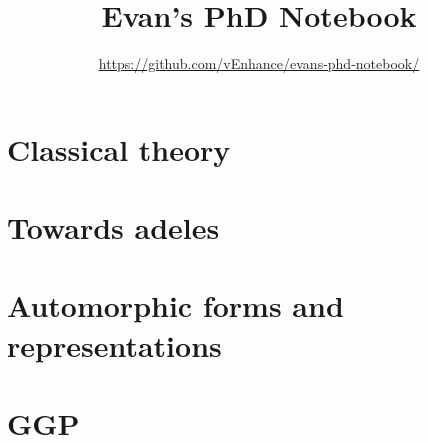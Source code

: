\documentclass[11pt]{scrreprt}
\begin{document}
\title{Evan's PhD Notebook}
\subtitle{\url{https://github.com/vEnhance/evans-phd-notebook/}}
\maketitle


\tableofcontents

\part{Classical theory}




\part{Towards adeles}




\part{Automorphic forms and representations}



\part{GGP}

\end{document}
